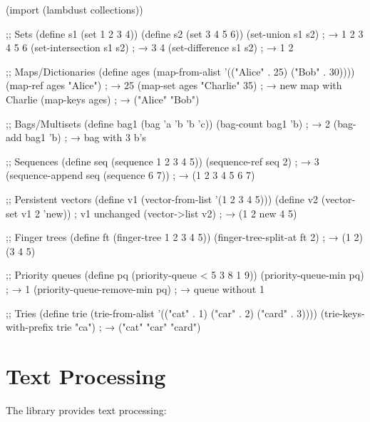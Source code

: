 \begin{example}
\begin{lambdustcode}
(import (lambdust collections))

;; Sets
(define s1 (set 1 2 3 4))
(define s2 (set 3 4 5 6))
(set-union s1 s2)                        ; → {1 2 3 4 5 6}
(set-intersection s1 s2)                 ; → {3 4}
(set-difference s1 s2)                   ; → {1 2}

;; Maps/Dictionaries  
(define ages (map-from-alist '(("Alice" . 25) ("Bob" . 30))))
(map-ref ages "Alice")                   ; → 25
(map-set ages "Charlie" 35)              ; → new map with Charlie
(map-keys ages)                          ; → ("Alice" "Bob")

;; Bags/Multisets
(define bag1 (bag 'a 'b 'b 'c))
(bag-count bag1 'b)                      ; → 2
(bag-add bag1 'b)                        ; → bag with 3 b's

;; Sequences
(define seq (sequence 1 2 3 4 5))
(sequence-ref seq 2)                     ; → 3
(sequence-append seq (sequence 6 7))     ; → (1 2 3 4 5 6 7)

;; Persistent vectors
(define v1 (vector-from-list '(1 2 3 4 5)))
(define v2 (vector-set v1 2 'new))       ; v1 unchanged
(vector->list v2)                        ; → (1 2 new 4 5)

;; Finger trees
(define ft (finger-tree 1 2 3 4 5))
(finger-tree-split-at ft 2)              ; → (1 2) (3 4 5)

;; Priority queues
(define pq (priority-queue < 5 3 8 1 9))
(priority-queue-min pq)                  ; → 1
(priority-queue-remove-min pq)           ; → queue without 1

;; Tries
(define trie (trie-from-alist '(("cat" . 1) ("car" . 2) ("card" . 3))))
(trie-keys-with-prefix trie "ca")        ; → ("cat" "car" "card")
\end{lambdustcode}
\end{example}

\section{Text Processing}
\label{sec:text-processing}


The  library provides text processing:

